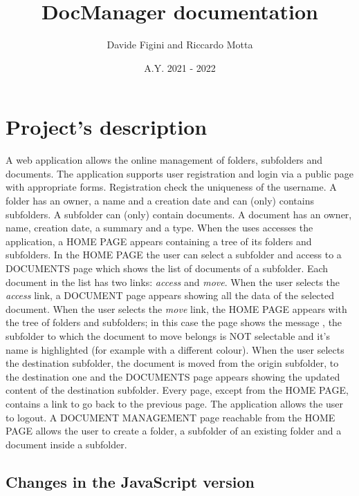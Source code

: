 \documentclass[a4paper, dvipsnames]{article}
\title{\textbf{DocManager documentation}}
\author{Davide Figini and Riccardo Motta}
\date{A.Y. 2021 - 2022}
\begin{document}
	\maketitle
	
	\section{Project's description}
	
	\begin{multicols}{2}
		A web application allows the online management of folders, subfolders and documents. The application supports user registration and login via a public page with appropriate forms. Registration check the uniqueness of the username. A folder has an owner, a name and a creation date and can (only) contains subfolders. A subfolder can (only) contain documents. A document has an owner, name, creation date, a summary and a type. When the uses accesses the application, a HOME PAGE appears containing a tree of its folders and subfolders. In the HOME PAGE the user can select a subfolder and access to a DOCUMENTS page which shows the list of documents of a subfolder. Each document in the list has two links: \textit{access} and \textit{move}. When the user selects the \textit{access} link, a DOCUMENT page appears showing all the data of the selected document. When the user selects the \textit{move} link, the HOME PAGE appears with the tree of folders and subfolders; in this case the page shows the message , the subfolder to which the document to move belongs is NOT selectable and it's name is highlighted (for example with a different colour). When the user selects the destination subfolder, the document is moved from the origin subfolder, to the destination one and the DOCUMENTS page appears showing the updated content of the destination subfolder. Every page, except from the HOME PAGE, contains a link to go back to the previous page. The application allows the user to logout. A DOCUMENT MANAGEMENT page reachable from the HOME PAGE allows the user to create a folder, a subfolder of an existing folder and a document inside a subfolder.
	\end{multicols}
	
	\subsection{Changes in the JavaScript version}
	
\end{document}
